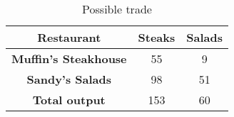 \begin{table}[h]
  \centering
    \begin{tabular}{|c|c|c|}
      \hline
      \textbf{Restaurant} & \textbf{Steaks} & \textbf{Salads} \\
      \hline
      \textbf{Muffin's Steakhouse} & 55 & 9 \\
      \hline
      \textbf{Sandy's Salads} & 98 & 51 \\
      \hline
      \textbf{Total output} & 153 & 60 \\
      \hline
    \end{tabular}
    \caption{Possible trade}
  \end{table}